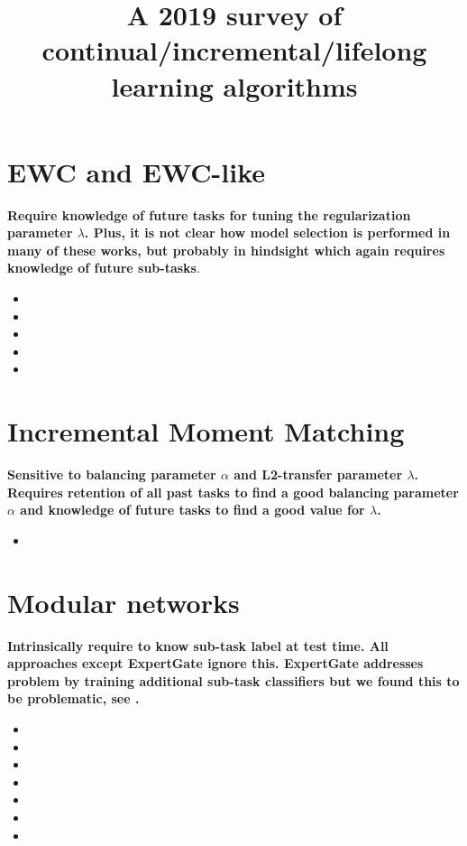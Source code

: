 \documentclass{article}
\title{A 2019 survey of continual/incremental/lifelong learning algorithms}
\begin{document}
\section{EWC and EWC-like}
\textbf{Require knowledge of future tasks for tuning the regularization parameter $\lambda$. Plus, it is not clear how model selection is performed in many of these works, but probably in hindsight which again requires knowledge of future sub-tasks}. 
\begin{itemize}
\item {}
\item {}
\item {}
\item {}
\item {}
\end{itemize}

\section{Incremental Moment Matching}
\textbf{Sensitive to balancing parameter $\alpha$ and L2-transfer parameter $\lambda$. Requires retention of all past tasks to find a good balancing parameter $\alpha$ and knowledge of future tasks to find a good value for $\lambda$.}
\begin{itemize}
\item {}
\end{itemize}
%
\section{Modular networks}
\textbf{Intrinsically require to know sub-task label at test time. All approaches except ExpertGate\cite{aljundi2017expertGate} ignore this. ExpertGate addresses problem by training additional sub-task classifiers but we found this to be problematic, see \cite{gepperthincremental}.}
\begin{itemize}
\item {}
\item {}
\item {}
\item {}
\item {}
\item {}
\item {}
\end{itemize}
\end{document}
